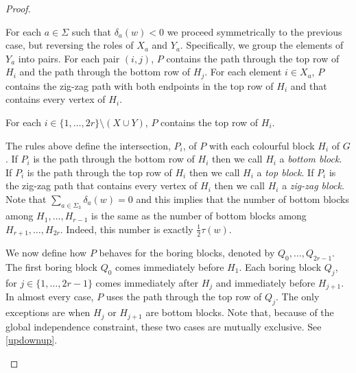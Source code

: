 \documentclass{patmorin}
\begin{document}
\begin{proof}
\begin{compactenum}
        \item For each $a\in\Sigma$ such that $\delta_a(w)<0$ we proceed symmetrically to the previous case, but reversing the roles of $X_a$ and $Y_a$.  Specifically, we group the elements of $Y_a$ into pairs.  For each pair $(i,j)$, $P$ contains the path through the top row of $H_i$ and the path through the bottom row of $H_j$.  For each element $i\in X_a$, $P$ contains the zig-zag path with both endpoints in the top row of $H_i$ and that contains every vertex of $H_i$.

        \item For each $i\in\{1,\ldots,2r\}\setminus(X\cup Y)$, $P$ contains the top row of $H_i$.
    \end{compactenum}
    The rules above define the intersection, $P_i$, of $P$ with each colourful block $H_i$ of $G$.  If $P_i$ is the path through the bottom row of $H_i$ then we call $H_i$ a \emph{bottom block}. If $P_i$ is the path through the top row of $H_i$ then we call $H_i$ a \emph{top block}.  If $P_i$ is the zig-zag path that contains every vertex of $H_i$ then we call $H_i$ a \emph{zig-zag block}.  Note that $\sum_{a\in\Sigma_3} \delta_a(w) = 0$ and this implies that the number of bottom blocks among $H_1,\ldots,H_{r-1}$ is the same as the number of bottom blocks among $H_{r+1},\ldots,H_{2r}$.  Indeed, this number is exactly $\tfrac{1}{2}\tau(w)$.

    We now define how $P$ behaves for the boring blocks, denoted by  $Q_0,\ldots,Q_{2r-1}$. The first boring block $Q_0$ comes immediately before $H_1$. Each boring block $Q_j$, for $j\in\{1,\ldots,2r-1\}$ comes immediately after $H_j$ and immediately before $H_{j+1}$.  In almost every case, $P$ uses the path through the top row of $Q_j$.  The only exceptions are when $H_j$ or $H_{j+1}$ are bottom blocks. Note that, because of the global independence constraint, these two cases are mutually exclusive. See \cref{updownup}.

    \begin{figure}
    \end{figure}


\end{proof}
\end{document}
